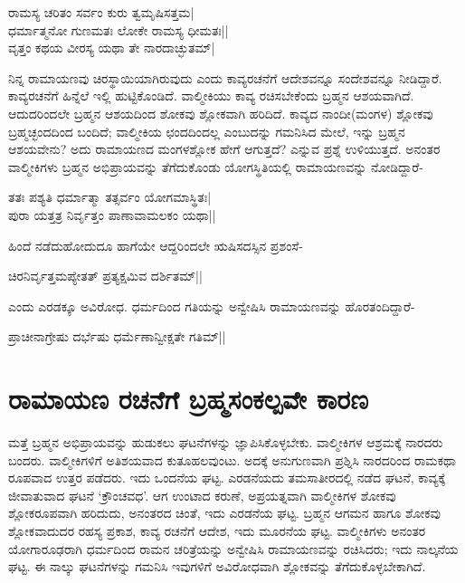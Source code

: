 \begin{shloka} 
ರಾಮಸ್ಯ ಚರಿತಂ ಸರ್ವಂ ಕುರು ತ್ವಮೃಷಿಸತ್ತಮ|\\ 
ಧರ್ಮಾತ್ಮನೋ ಗುಣಮತಃ ಲೋಕೇ ರಾಮಸ್ಯ ಧೀಮತಃ||\\ 
ವೃತ್ತಂ ಕಥಯ ವೀರಸ್ಯ ಯಥಾ ತೇ ನಾರದಾಚ್ಛುತಮ್‍|
\end{shloka}

ನಿನ್ನ ರಾಮಾಯಣವು ಚಿರಸ್ಥಾಯಿಯಾಗಿರುವುದು ಎಂದು ಕಾವ್ಯರಚನೆಗೆ ಆದೇಶವನ್ನೂ ಸಂದೇಶವನ್ನೂ ನೀಡಿದ್ದಾರೆ. ಕಾವ್ಯರಚನೆಗೆ ಹಿನ್ನೆಲೆ ಇಲ್ಲಿ ಹುಟ್ಟಿಕೊಂಡಿದೆ. ವಾಲ್ಮೀಕಿಯು ಕಾವ್ಯ ರಚಿಸಬೇಕೆಂದು ಬ್ರಹ್ಮನ ಆಶಯವಾಗಿದೆ. ಆದುದರಿಂದಲೇ ಬ್ರಹ್ಮನ ಆಶಯದಿಂದ ಶೋಕವು ಶ್ಲೋಕವಾಗಿ ಹರಿದಿದೆ. ಕಾವ್ಯದ ನಾಂದೀ(ಮಂಗಳ) ಶ್ಲೋಕವು ಬ್ರಹ್ಮಚ್ಛಂದದಿಂದ ಬಂದಿದೆ; ವಾಲ್ಮೀಕಿಯ ಛಂದದಿಂದಲ್ಲ ಎಂಬುದನ್ನು ಗಮನಿಸಿದ ಮೇಲೆ, ಇನ್ನು ಬ್ರಹ್ಮನ ಆಶಯವೇನು? ಅದು ರಾಮಾಯಣದ ಮಂಗಳಶ್ಲೋಕ ಹೇಗೆ ಆಗುತ್ತದೆ? ಎನ್ನುವ ಪ್ರಶ್ನೆ ಉಳಿಯುತ್ತದೆ. ಅನಂತರ ವಾಲ್ಮೀಕಿಗಳು ಬ್ರಹ್ಮನ ಅಭಿಪ್ರಾಯವನ್ನು ತೆಗೆದುಕೊಂಡು ಯೋಗಸ್ಥಿತಿಯಲ್ಲಿ ರಾಮಾಯಣವನ್ನು ನೋಡಿದ್ದಾರೆ- 

\begin{shloka}
ತತಃ ಪಶ್ಯತಿ ಧರ್ಮಾತ್ಮಾ ತತ್ಸರ್ವಂ ಯೋಗಮಾಸ್ಥಿತಃ|\\ 
ಪುರಾ ಯತ್ತತ್ರ ನಿರ್ವೃತ್ತಂ ಪಾಣಾವಾಮಲಕಂ ಯಥಾ|| 
\end{shloka}
ಹಿಂದೆ ನಡೆದುಹೋದುದೂ ಹಾಗೆಯೇ ಆದ್ದರಿಂದಲೇ ಋಷಿಸದಸ್ಸಿನ ಪ್ರಶಂಸೆ- 

\begin{shloka}
ಚಿರನಿರ್ವೃತ್ತಮಪ್ಯೇತತ್‍ ಪ್ರತ್ಯಕ್ಷಮಿವ ದರ್ಶಿತಮ್‍||
\end{shloka}
ಎಂದು ಎರಡಕ್ಕೂ ಅವಿರೋಧ. ಧರ್ಮದಿಂದ ಗತಿಯನ್ನು ಅನ್ವೇಷಿಸಿ ರಾಮಾಯಣವನ್ನು ಹೊರತಂದಿದ್ದಾರೆ- 

\begin{shloka}
ಪ್ರಾಚೀನಾಗ್ರೇಷು ದರ್ಭೆಷು ಧರ್ಮೆಣಾನ್ವೀಕ್ಷತೇ ಗತಿಮ್‍||
\end{shloka}

\section*{ರಾಮಾಯಣ ರಚನೆಗೆ ಬ್ರಹ್ಮಸಂಕಲ್ಪವೇ ಕಾರಣ} 

ಮತ್ತೆ ಬ್ರಹ್ಮನ ಅಭಿಪ್ರಾಯವನ್ನು ಹುಡುಕಲು ಘಟನೆಗಳನ್ನು ಜ್ಞಾಪಿಸಿಕೊಳ್ಳಬೇಕು. ವಾಲ್ಮೀಕಿಗಳ ಆಶ್ರಮಕ್ಕೆ ನಾರದರು ಬಂದರು. ವಾಲ್ಮೀಕಿಗಳಿಗೆ ಅತಿಶಯವಾದ ಕುತೂಹಲವುಂಟು. ಅದಕ್ಕೆ ಅನುಗುಣವಾಗಿ ಪ್ರಶ್ನಿಸಿ ನಾರದರಿಂದ ರಾಮಕಥಾ ರೂಪವಾದ ಉತ್ತರ ಪಡೆದರು. ಇದು ಒಂದನೆಯ ಘಟ್ಟ. ಎರಡನೆಯದು ತಮಸಾತೀರದಲ್ಲಿ ನಡೆದ ಘಟನೆ, ಕಾವ್ಯಕ್ಕೆ ಜೀವಾತುವಾದ ಘಟನೆ `ಕ್ರೌಂಚವಧ'. ಆಗ ಉಂಟಾದ ಕರುಣೆ, ಅಪ್ರಯತ್ನವಾಗಿ ವಾಲ್ಮೀಕಿಗಳ ಶೋಕವು ಶ್ಲೋಕರೂಪವಾಗಿ ಹರಿದುದು, ಅನಂತರದ ಚಿಂತೆ, ಇದು ಎರಡನೆಯ ಘಟ್ಟ. ಬ್ರಹ್ಮನ ಆಗಮನ ಹಾಗೂ ಶೋಕವು ಶ್ಲೋಕವಾದುದರ ರಹಸ್ಯ ಪ್ರಕಾಶ, ಕಾವ್ಯ ರಚನೆಗೆ ಆದೇಶ, ಇದು ಮೂರನೆಯ ಘಟ್ಟ. ವಾಲ್ಮೀಕಿಗಳು ಅನಂತರ ಯೋಗಾರೂಢರಾಗಿ ಧರ್ಮದಿಂದ ರಾಮನ ಚರಿತ್ರೆಯನ್ನು ಅನ್ವೇಷಿಸಿ ರಾಮಾಯಣವನ್ನು ರಚಿಸಿದರು; ಇದು ನಾಲ್ಕನೆಯ ಘಟ್ಟ. ಈ ನಾಲ್ಕು ಘಟನೆಗಳನ್ನು ಗಮನಿಸಿ ಇವುಗಳಿಗೆ ಅವಿರೋಧವಾಗಿ ಶ್ಲೋಕವನ್ನು ತೆಗೆದುಕೊಳ್ಳಬೇಕಾಗಿದೆ. 


